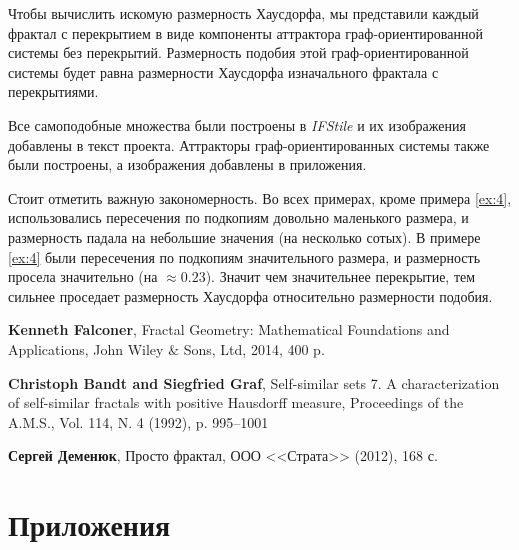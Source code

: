\documentclass[a4paper,14pt]{extarticle} %
\newcommand{\0}{\varnothing}
\newcommand{\8}{\infty}
\theoremstyle{definition}
\begin{document}
Чтобы вычислить искомую размерность Хаусдорфа, мы представили каждый фрактал с перекрытием в виде компоненты аттрактора граф-ориентированной системы без перекрытий.
Размерность подобия этой граф-ориентированной системы будет равна размерности Хаусдорфа изначального фрактала с перекрытиями.

Все самоподобные множества были построены в {\em IFStile}  и их изображения добавлены в текст проекта. Аттракторы граф-ориентированных системы также были построены, а изображения добавлены в приложения.

Стоит отметить важную закономерность. 
Во всех примерах, кроме примера \ref{ex:4}, использовались пересечения по подкопиям довольно маленького размера, и размерность падала на небольшие значения (на нес\-коль\-ко сотых).
В примере \ref{ex:4} были пересечения по подкопиям значительного размера, и размерность просела значительно (на $\approx0.23$).
Значит чем значительнее перекрытие, тем сильнее проседает размерность Хаусдорфа относительно размерности подобия.


\newpage
{} %
\begin{thebibliography}{9}
    \textbf{Kenneth Falconer},
    Fractal Geometry: Mathematical Foundations and Applications,
    John Wiley $\&$ Sons, Ltd, 2014, 400 p.

    \textbf{Christoph Bandt and Siegfried Graf},
    Self-similar sets 7. A characterization of self-similar fractals with positive Hausdorff measure,
    Proceedings of the A.M.S., Vol. 114, N. 4 (1992), p. 995--1001

    \textbf{Сергей Деменюк},
    Просто фрактал,  
    ООО <<Страта>> (2012), 168 с.\end{thebibliography}


\newpage
\section*{Приложения}
\end{document}
